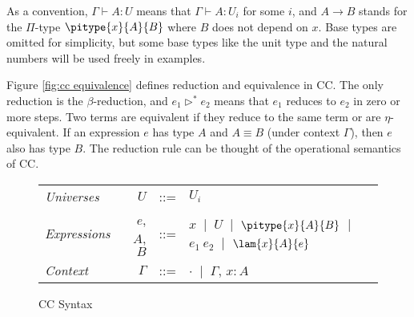 As a convention, $\Gamma \vdash A : U$ means that $\Gamma \vdash A : U_i$ for some $i$, and $A \rightarrow B$ stands for the $\Pi$-type $\pitype{x}{A}{B}$ where $B$ does not depend on $x$. Base types are omitted for simplicity, but some base types like the unit type and the natural numbers will be used freely in examples.

Figure \ref{fig:cc equivalence} defines reduction and equivalence in CC. The only reduction is the $\beta$-reduction, and $e_1 \triangleright^* e_2$ means that $e_1$ reduces to $e_2$ in zero or more steps. Two terms are equivalent if they reduce to the same term or are $\eta$-equivalent. If an expression $e$ has type $A$ and $A \equiv B$ (under context $\Gamma$), then $e$ also has type $B$. The reduction rule can be thought of the operational semantics of CC.

\begin{figure}
	\renewcommand{\arraystretch}{1.3}
	\begin{tabular}{l r l l}
		\textit{Universes}   & $U$       & ::= & ${U_i}$ \\
		\textit{Expressions} & ${e}$, ${A}$, ${B}$  & ::= & 
			${x}$ $\ |\ $ ${U}$ $\ |\ $ $\pitype{x}{A}{B}$ $\ |\ $ ${e_1}\ {e_2}$ $\ |\ $ $\lam{x}{A}{e}$\\
		\textit{Context} & ${\Gamma}$ & ::= & ${\cdot}$ $\ |\ $ ${\Gamma}$, ${x} : {A}$ \\
	\end{tabular}

	\caption{CC Syntax}
    \label{fig:cc syntax}
\end{figure}

